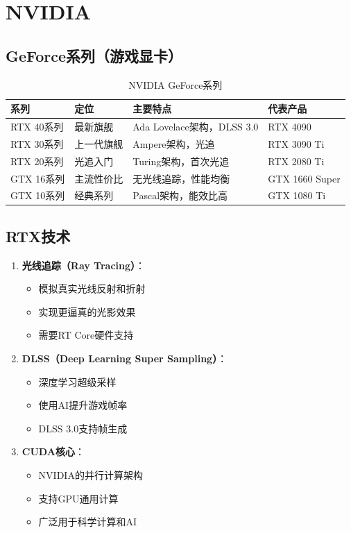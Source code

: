\documentclass[12pt,UTF8]{ctexbook}
\begin{document}
\chapter{NVIDIA}

\section{GeForce系列（游戏显卡）}

\begin{table}[H]
    \centering
    \begin{tabular}{|p{2cm}|p{3cm}|p{5cm}|p{3cm}|}
        \hline
        \textbf{系列} & \textbf{定位} & \textbf{主要特点} & \textbf{代表产品} \\
        \hline
        RTX 40系列 & 最新旗舰 & Ada Lovelace架构，DLSS 3.0 & RTX 4090 \\
        \hline
        RTX 30系列 & 上一代旗舰 & Ampere架构，光追 & RTX 3090 Ti \\
        \hline
        RTX 20系列 & 光追入门 & Turing架构，首次光追 & RTX 2080 Ti \\
        \hline
        GTX 16系列 & 主流性价比 & 无光线追踪，性能均衡 & GTX 1660 Super \\
        \hline
        GTX 10系列 & 经典系列 & Pascal架构，能效比高 & GTX 1080 Ti \\
        \hline
    \end{tabular}
    \caption{NVIDIA GeForce系列}
    \label{tab:nvidia_geforce}
\end{table}

\section{RTX技术}

\begin{enumerate}
    \item \textbf{光线追踪（Ray Tracing）}：
    \begin{itemize}[leftmargin=2em]
        \item 模拟真实光线反射和折射
        \item 实现更逼真的光影效果
        \item 需要RT Core硬件支持
    \end{itemize}
    
    \item \textbf{DLSS（Deep Learning Super Sampling）}：
    \begin{itemize}[leftmargin=2em]
        \item 深度学习超级采样
        \item 使用AI提升游戏帧率
        \item DLSS 3.0支持帧生成
    \end{itemize}
    
    \item \textbf{CUDA核心}：
    \begin{itemize}[leftmargin=2em]
        \item NVIDIA的并行计算架构
        \item 支持GPU通用计算
        \item 广泛用于科学计算和AI
    \end{itemize}
\end{enumerate}
\end{document}
